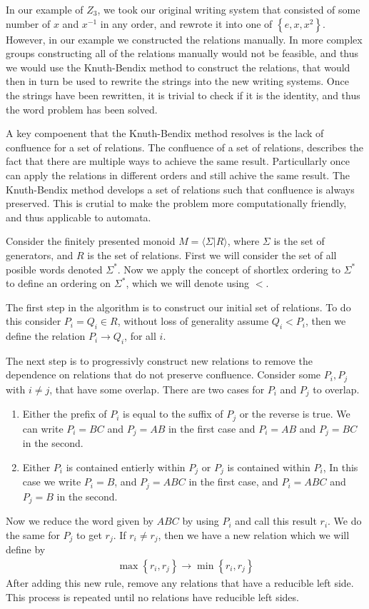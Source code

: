 \documentclass[10pt]{amsart}
\theoremstyle{definition}
\theoremstyle{remark}
\begin{document}
In our example of $Z_3$, we took our original writing system that consisted of
some number of $x$ and $x^{-1}$ in any order, and rewrote it into one of
$\left\{e, x, x^2\right\}$. However, in our example we constructed the
relations manually. In more complex groups constructing all of the relations
manually would not be feasible, and thus we would use the Knuth-Bendix method
to construct the relations, that would then in turn be used to rewrite the
strings into the new writing systems. Once the strings have been rewritten, it
is trivial to check if it is the identity, and thus the word problem has been
solved.

A key compoenent that the Knuth-Bendix method resolves is the lack of
confluence for a set of relations. The confluence of a set of relations,
describes the fact that there are multiple ways to achieve the same result.
Particullarly once can apply the relations in different orders and still achive
the same result. The Knuth-Bendix method develops a set of relations such that
confluence is always preserved. This is crutial to make the problem more
computationally friendly, and thus applicable to automata.

Consider the finitely presented monoid $M=\langle \Sigma\vert R\rangle$, where
$\Sigma$ is the set of generators, and $R$ is the set of relations. First we
will consider the set of all posible words denoted $\Sigma^*$. Now we apply the
concept of shortlex ordering to $\Sigma^*$ to define an ordering on $\Sigma^*$,
which we will denote using $<$.

The first step in the algorithm is to construct our initial set of relations.
To do this consider $P_i=Q_i\in R$, without loss of generality assume
$Q_i<P_i$, then we define the relation $P_i\rightarrow Q_i$, for all $i$.

The next step is to progressivly construct new relations to remove the
dependence on relations that do not preserve confluence. Consider some
$P_i,P_j$ with $i\neq j$, that have some overlap. There are two cases for $P_i$
and $P_j$ to overlap.
\begin{enumerate}
  \item Either the prefix of $P_i$ is equal to the suffix of $P_j$ or the
    reverse is true. We can write $P_i=BC$ and $P_j=AB$ in the first case and
    $P_i=AB$ and $P_j=BC$ in the second.
  \item Either $P_i$ is contained entierly within $P_j$ or $P_j$ is contained
    within $P_i$, In this case we write $P_i=B$, and $P_j=ABC$ in the first
    case, and $P_i=ABC$ and $P_j=B$ in the second.
\end{enumerate}
Now we reduce the word given by $ABC$ by using $P_i$ and call this result
$r_i$. We do the same for $P_j$ to get $r_j$. If $r_i\neq r_j$, then we have a
new relation which we will define by
\begin{align*}
  \max\left\{r_i,r_j\right\}\rightarrow\min\left\{r_i,r_j\right\}
\end{align*}
After adding this new rule, remove any relations that have a reducible left
side. This process is repeated until no relations have reducible left sides.
\end{document}
